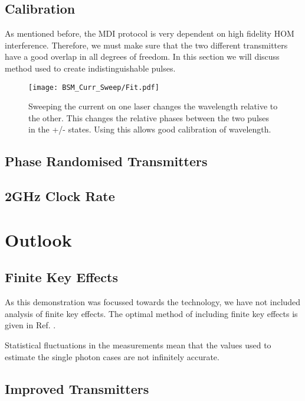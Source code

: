 \subsection{Calibration}

As mentioned before, the \ac{MDI} protocol is very dependent on high fidelity \ac{HOM} interference. Therefore, we must make sure that the two different transmitters have a good overlap in all degrees of freedom. In this section we will discuss method used to create indistinguishable pulses.

\begin{figure}[tbp]
	\centering
	\texttt{[image: BSM\_Curr\_Sweep/Fit.pdf]}
	\caption[Laser current-error sweep]{Sweeping the current on one laser changes the wavelength relative to the other. This changes the relative phases between the two pulses in the +/- states. Using this allows good calibration of wavelength.}
	\label{fig:wavelength_cal}
\end{figure}


\subsection{Phase Randomised Transmitters}

\subsection{2GHz Clock Rate}

\section{Outlook}

\subsection{Finite Key Effects}

As this demonstration was focussed towards the technology, we have not included analysis of finite key effects. The optimal method of including finite key effects is given in Ref. \cite{zhou2016}.

Statistical fluctuations in the measurements mean that the values used to estimate the single photon cases are not infinitely accurate. 

\subsection{Improved Transmitters}

